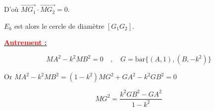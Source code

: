 \documentclass[12pt,a4paper]{article}
\begin{document}
\vspace{0.5cm}

D'où $\overrightarrow{MG_1} \cdot \overrightarrow{MG_2} = 0$.

$E_k$ est alors le cercle de diamètre $[G_1 G_2]$.

\vspace{0.3cm}

\textbf{\underline{\textcolor{red}{Autrement :}}}

\[
MA^2 - k^2 MB^2 = 0 \quad, \quad G = \text{bar}\{(A, 1), (B, -k^2)\}
\]

Or $MA^2 - k^2 MB^2 = (1 - k^2)MG^2 + GA^2 - k^2 GB^2 = 0$

\[
MG^2 = \frac{k^2 GB^2 - GA^2}{1 - k^2}
\]
\end{document}
